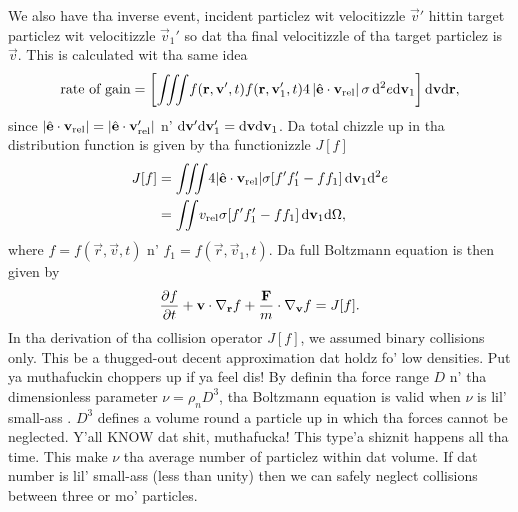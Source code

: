 We also have tha inverse event, incident particlez wit velocitizzle $\vec v'$ hittin target particlez wit velocitizzle $\vec v_1'$ so dat tha final velocitizzle of tha target particlez is $\vec v$. This is calculated wit tha same idea
\begin{align}
	\text{rate of gain} = \left[\iiint\! f(\mathbf r, \mathbf v', t)f(\mathbf r, \mathbf v_1', t)4\left|\hat {\mathbf{e}} \cdot \mathbf v_\text{rel} \right|\sigma \,\mathrm{d}^2 e\mathrm{d}\mathbf v_1\right]\mathrm{d}\mathbf v\mathrm{d}\mathbf r,
\end{align}
since $|\hat {\mathbf{e}}\cdot \mathbf v_\text{rel}| = |\hat {\mathbf{e}}\cdot \mathbf v_\text{rel}'|$ n' $\mathrm{d}\mathbf v'\mathrm{d}\mathbf v_1' = \mathrm{d}\mathbf v\mathrm{d}\mathbf v_1$. Da total chizzle up in tha distribution function is given by tha functionizzle $J[f]$
\begin{align}
	J[f] &= \iiint\! 4|\hat {\mathbf{e}}\cdot\mathbf v_\text{rel}|\sigma[f'f_1' - ff_1]\,\mathrm{d}\mathbf v_1 \mathrm{d}^2e\\
	&= \iint\! v_\text{rel} \sigma[f'f_1' - ff_1] \,\mathrm{d}\mathbf v_1 \mathrm{d}\Omega,
\end{align}
where $f = f(\vec r, \vec v, t)$ n' $f_1 = f(\vec r, \vec v_1, t)$. Da full Boltzmann equation is then given by
\begin{align}
	\label{eq:boltzmann_equation}
	\frac{\partial f}{\partial t} + \mathbf v\cdot \nabla_\mathbf r f + \frac{\mathbf F}{m}\cdot\nabla_\mathbf v f = J[f].
\end{align}
In tha derivation of tha collision operator $J[f]$, we assumed binary collisions only. This be a thugged-out decent approximation dat holdz fo' low densities. Put ya muthafuckin choppers up if ya feel dis! By definin tha force range $D$ n' tha dimensionless parameter $\nu = \rho_n D^3$, tha Boltzmann equation is valid when $\nu$ is lil' small-ass \cite{mclennan1989introduction}. $D^3$ defines a volume round a particle up in which tha forces cannot be neglected. Y'all KNOW dat shit, muthafucka! This type'a shiznit happens all tha time. This make $\nu$ tha average number of particlez within dat volume. If dat number is lil' small-ass (less than unity) then we can safely neglect collisions between three or mo' particles.
